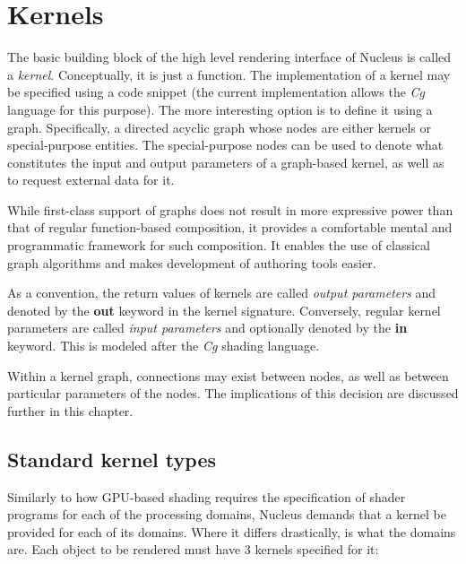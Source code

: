 \section{Kernels}
\label{sec:Kernels}

The basic building block of the high level rendering interface of Nucleus is called a \emph{kernel}. Conceptually, it is just a function. The implementation of a kernel may be specified using a code snippet (the current implementation allows the \emph{Cg} language for this purpose). The more interesting option is to define it using a graph. Specifically, a directed acyclic graph whose nodes are either kernels or special-purpose entities. The special-purpose nodes can be used to denote what constitutes the input and output parameters of a graph-based kernel, as well as to request external data for it.

While first-class support of graphs does not result in more expressive power than that of regular function-based composition, it provides a comfortable mental and programmatic framework for such composition. It enables the use of classical graph algorithms and makes development of authoring tools easier.

As a convention, the return values of kernels are called \emph{output parameters} and denoted by the \textbf{out} keyword in the kernel signature. Conversely, regular kernel parameters are called \emph{input parameters} and optionally denoted by the \textbf{in} keyword. This is modeled after the \emph{Cg} shading language.

Within a kernel graph, connections may exist between nodes, as well as between particular parameters of the nodes. The implications of this decision are discussed further in this chapter.

\subsection{Standard kernel types}

Similarly to how GPU-based shading requires the specification of shader programs for each of the processing domains, Nucleus demands that a kernel be provided for each of its domains. Where it differs drastically, is what the domains are. Each object to be rendered must have 3 kernels specified for it:

